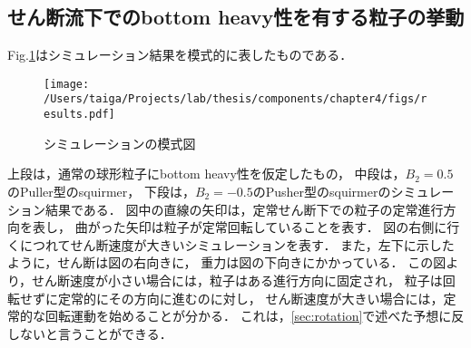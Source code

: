 \subsection{せん断流下でのbottom heavy性を有する粒子の挙動}
\label{simulation_results}
Fig.\ref{fig:result}はシミュレーション結果を模式的に表したものである．

    \begin{figure}[htbp]
        \centering
        \texttt{[image: /Users/taiga/Projects/lab/thesis/components/chapter4/figs/results.pdf]}
        \caption{シミュレーションの模式図}
        \label{fig:result}
    \end{figure}

\noindent
上段は，通常の球形粒子にbottom heavy性を仮定したもの，
中段は，$B_2 = 0.5$のPuller型のsquirmer，
下段は，$B_2 = -0.5$のPusher型のsquirmerのシミュレーション結果である．
図中の直線の矢印は，定常せん断下での粒子の定常進行方向を表し，
曲がった矢印は粒子が定常回転していることを表す．
図の右側に行くにつれてせん断速度が大きいシミュレーションを表す．
また，左下に示したように，せん断は図の右向きに，
重力は図の下向きにかかっている．
この図より，せん断速度が小さい場合には，粒子はある進行方向に固定され，
粒子は回転せずに定常的にその方向に進むのに対し，
せん断速度が大きい場合には，定常的な回転運動を始めることが分かる．
これは，\ref{sec:rotation}で述べた予想に反しないと言うことができる．
